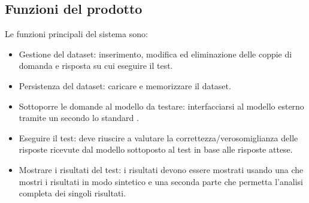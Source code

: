 
\subsection{Funzioni del prodotto}
Le funzioni principali del sistema sono:
\begin{itemize}
    \item Gestione del dataset: inserimento, modifica ed eliminazione delle coppie di domanda e risposta su cui eseguire il test.
    \item Persistenza del dataset: caricare e memorizzare il dataset.
    \item Sottoporre le domande al modello da testare: interfacciarsi al modello esterno tramite un  secondo lo standard .
    \item Eseguire il test: deve riuscire a valutare la correttezza/verosomiglianza delle risposte ricevute dal modello sottoposto al test in base alle risposte attese.
    \item Mostrare i risultati del test: i risultati devono essere mostrati usando una  che mostri i risultati in modo sintetico e una seconda parte che permetta l'analisi completa dei singoli risultati.
\end{itemize}